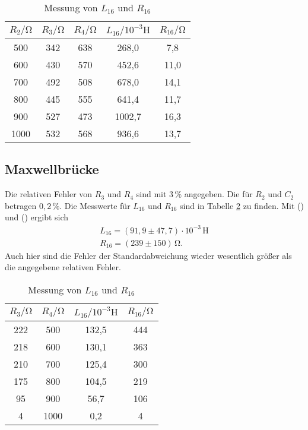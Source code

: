 \begin{table}
  \centering
  \caption{Messung von $L_{16}$ und $R_{16}$}
  \label{tab:Cx,Rx}
  \begin{tabular}{c c c c c}
    \toprule
    $R_2/\unit{\ohm}$ & $R_3/\unit{\ohm}$ & $R_4/\unit{\ohm}$ & $L_{16}/10^{-3}\unit{\henry}$ & $R_{16}/\unit{\ohm}$ \\
    \midrule
     500 & 342 & 638 &  268,0 &  7,8 \\
     600 & 430 & 570 &  452,6 & 11,0 \\
     700 & 492 & 508 &  678,0 & 14,1 \\
     800 & 445 & 555 &  641,4 & 11,7 \\
     900 & 527 & 473 & 1002,7 & 16,3 \\
    1000 & 532 & 568 &  936,6 & 13,7 \\
    \bottomrule
  \end{tabular}
\end{table}

\subsection{Maxwellbrücke}
Die relativen Fehler von $R_3$ und $R_4$ sind mit $3\,\% $ angegeben. Die für $R_2$ und $C_2$ betragen $0,2\,\%$.
Die Messwerte für $L_{16}$ und $R_{16}$ sind in Tabelle \ref{tab:Cx,Rx,Maxwell} zu finden. Mit () und () ergibt sich
\begin{gather*}
  L_{16} = (91,9 \pm 47,7)\cdot 10^{-3} \,\unit{\henry} \\
  R_{16} = (239 \pm 150)\,\unit{\ohm}.
\end{gather*}
Auch hier sind die Fehler der Standardabweichung wieder wesentlich größer als die angegebene relativen Fehler.

\begin{table}
  \centering
  \caption{Messung von $L_{16}$ und $R_{16}$}
  \label{tab:Cx,Rx,Maxwell}
  \begin{tabular}{c c c c}
    \toprule
    $R_3/\unit{\ohm}$ & $R_4/\unit{\ohm}$ & $L_{16}/10^{-3}\unit{\henry}$ & $R_{16}/\unit{\ohm}$ \\
    \midrule
    222 &  500 &  132,5 & 444 \\
    218 &  600 &  130,1 & 363 \\
    210 &  700 &  125,4 & 300 \\
    175 &  800 &  104,5 & 219 \\
     95 &  900 &   56,7 & 106 \\
      4 & 1000 &    0,2 &   4 \\
    \bottomrule
  \end{tabular}
\end{table}

